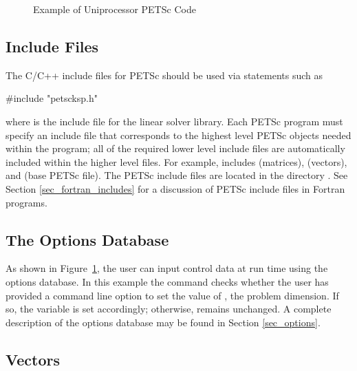 \begin{figure}[H]
{\footnotesize
{}
}
\caption{Example of Uniprocessor PETSc Code}
\label{fig_example1}
\end{figure}

\subsection*{Include Files}

The C/C++ include files for PETSc should be used via statements such as
\begin{tabbing}
{\footnotesize
   \#include "petscksp.h"
}
\end{tabbing}
where  is the include file for the linear solver library.
Each PETSc program must specify an
include file that corresponds to the highest level PETSc objects
needed within the program; all of the required lower level include
files are automatically included within the higher level files.  For
example,  includes  (matrices),
 (vectors), and  (base PETSc file).  
The PETSc include files are located in the directory 
.  See Section \ref{sec_fortran_includes}
for a discussion of PETSc include files in Fortran programs.

\subsection*{The Options Database}

As shown in Figure~\ref{fig_example1}, the user can input control data
at run time using the options database. In this example the command
 checks whether the user has
provided a command line option to set the value of , the
problem dimension.  If so, the variable  is set accordingly;
otherwise,  remains unchanged. A complete description of the
options database may be found in Section \ref{sec_options}.

\subsection*{Vectors}
\label{sec_vecintro}

